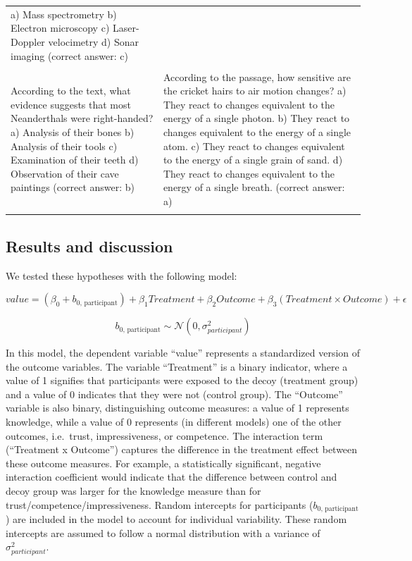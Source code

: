 \documentclass[
  english,
  doc,floatsintext]{apa6}
\begin{document}
\begin{longtable}[t]{>{\raggedright\arraybackslash}p{25em}|>{\raggedright\arraybackslash}p{25em}}
a) Mass spectrometry  
b) Electron microscopy  
c) Laser-Doppler velocimetry  
d) Sonar imaging  
(correct answer: c)\\
 & \\
According to the text, what evidence suggests that most Neanderthals were right-handed? 
a) Analysis of their bones 
b) Analysis of their tools 
c) Examination of their teeth 
d) Observation of their cave paintings
(correct answer: b) & According to the passage, how sensitive are the cricket hairs to air motion changes?
a) They react to changes equivalent to the energy of a single photon.  
b) They react to changes equivalent to the energy of a single atom.  
c) They react to changes equivalent to the energy of a single grain of sand.
d) They react to changes equivalent to the energy of a single breath.  
(correct answer: a)\\*
\end{longtable}
\endgroup{}

\subsection{Results and discussion}\label{results-and-discussion-3}

We tested these hypotheses with the following model:

\[
value = (\beta_{0} + b_\text{0, participant}) + \beta_{1} Treatment + \beta_{2} Outcome + \beta_{3} (Treatment \times Outcome) + \epsilon
\]

\[
b_\text{0, participant} \sim \mathcal{N}(0, \sigma^2_{participant})
\]

In this model, the dependent variable ``value'' represents a standardized version of the outcome variables. The variable ``Treatment'' is a binary indicator, where a value of 1 signifies that participants were exposed to the decoy (treatment group) and a value of 0 indicates that they were not (control group). The ``Outcome'' variable is also binary, distinguishing outcome measures: a value of 1 represents knowledge, while a value of 0 represents (in different models) one of the other outcomes, i.e.~trust, impressiveness, or competence. The interaction term (``Treatment x Outcome'') captures the difference in the treatment effect between these outcome measures. For example, a statistically significant, negative interaction coefficient would indicate that the difference between control and decoy group was larger for the knowledge measure than for trust/competence/impressiveness. Random intercepts for participants (\(b_\text{0, participant}\)) are included in the model to account for individual variability. These random intercepts are assumed to follow a normal distribution with a variance of \(\sigma^2_{participant}\).
\end{document}
